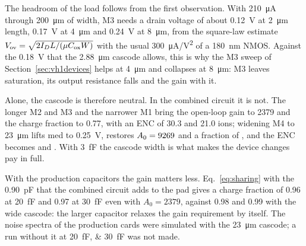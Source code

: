 \documentclass[11pt,a4paper]{article}
\begin{document}
%
The headroom of the load follows from the first observation. With
\SI{210}{\micro A} through \SI{200}{\um} of width, M3 needs a drain voltage
of about \SI{0.12}{V} at \SI{2}{\um} length, \SI{0.17}{V} at \SI{4}{\um}
and \SI{0.24}{V} at \SI{8}{\um}, from the square-law estimate
$V_{\rm ov}=\sqrt{2I_DL/(\mu C_{\rm ox}W)}$ with the usual
\SI{300}{\micro A/V^2} of a \SI{180}{nm} NMOS. Against the \SI{0.18}{V}
that the \SI{2.88}{\um} cascode allows, this is why the M3 sweep of
Section~\ref{sec:vh1devices} helps at \SI{4}{\um} and collapses at
\SI{8}{\um}: M3 leaves saturation, its output resistance falls and the
gain with it.

Alone, the cascode is therefore neutral. In the combined circuit it is
not. The longer M2 and M3 and the narrower M1 bring the open-loop gain to
\SI{2379}{} and the charge fraction to \SI{0.77}{}, with an ENC of
\SI{30.3}{} and \SI{21.0}{} ions; widening M4 to \SI{23}{\um} lifts
\textsf{med} to \SI{0.25}{V}, restores $A_0=9269$ and a fraction of
\vhImpFraction, and the ENC becomes \vhEncImpFive{} and \vhEncImpFull{}.
With \SI{3}{fF} the cascode width is what makes the device changes pay in
full.

With the production capacitors the gain matters less.
Eq.~\eqref{eq:sharing} with the \SI{0.90}{pF} that the combined circuit
adds to the pad gives a charge fraction of \SI{0.96}{} at \SI{20}{fF} and
\SI{0.97}{} at \SI{30}{fF} even with $A_0=2379$, against \SI{0.98}{} and
\SI{0.99}{} with the wide cascode: the larger capacitor relaxes the gain
requirement by itself. The noise spectra of the production cards were
simulated with the \SI{23}{\um} cascode; a run without it at
\SIlist{20;30}{fF} was not made.
\end{document}
